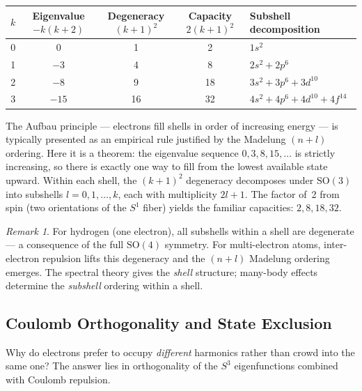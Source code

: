 \documentclass[12pt, a4paper]{article}
\theoremstyle{definition}
\theoremstyle{remark}
\newtheorem{remark}[theorem]{Remark}
\newcommand{\Sthree}{S^3}
\newcommand{\Sone}{S^1}
\newcommand{\SO}{\mathrm{SO}}
\begin{document}
\begin{center}
\renewcommand{\arraystretch}{1.3}
\begin{tabular}{ccccl}
\toprule
$k$ & Eigenvalue $-k(k{+}2)$ & Degeneracy $(k{+}1)^2$
  & Capacity $2(k{+}1)^2$ & Subshell decomposition \\
\midrule
0 & $0$   & 1  & 2  & $1s^2$ \\
1 & $-3$  & 4  & 8  & $2s^2 + 2p^6$ \\
2 & $-8$  & 9  & 18 & $3s^2 + 3p^6 + 3d^{10}$ \\
3 & $-15$ & 16 & 32 & $4s^2 + 4p^6 + 4d^{10} + 4f^{14}$ \\
\bottomrule
\end{tabular}
\end{center}

The Aufbau principle --- electrons fill shells in order of increasing
energy --- is typically presented as an empirical rule justified by the
Madelung $(n{+}l)$ ordering. Here it is a theorem: the eigenvalue sequence
$0, 3, 8, 15, \ldots$ is strictly increasing, so there is exactly one way
to fill from the lowest available state upward. Within each shell, the
$(k{+}1)^2$ degeneracy decomposes under $\SO(3)$ into subshells
$l = 0, 1, \ldots, k$, each with multiplicity $2l{+}1$. The factor of~2
from spin (two orientations of the $\Sone$ fiber) yields the familiar
capacities: $2, 8, 18, 32$.

\begin{remark}
For hydrogen (one electron), all subshells within a shell are degenerate ---
a consequence of the full $\SO(4)$ symmetry. For multi-electron atoms,
inter-electron repulsion lifts this degeneracy and the $(n{+}l)$ Madelung
ordering emerges. The spectral theory gives the \emph{shell} structure;
many-body effects determine the \emph{subshell} ordering within a shell.
\end{remark}

\subsection{Coulomb Orthogonality and State Exclusion}
\label{sec:coulomb_ortho}

Why do electrons prefer to occupy \emph{different} harmonics rather than
crowd into the same one? The answer lies in orthogonality of the $\Sthree$
eigenfunctions combined with Coulomb repulsion.
\end{document}
